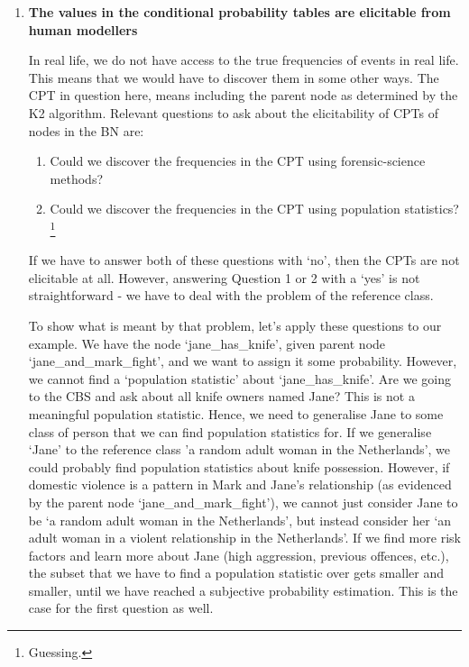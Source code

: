 \begin{enumerate}
\item \textbf{The values in the conditional probability tables are elicitable from human modellers}

In real life, we do not have access to the true frequencies of events in real life. This means that we would have to discover them in some other ways. The CPT in question here, means including the parent node as determined by the K2 algorithm. Relevant questions to ask about the elicitability of CPTs of nodes in the BN are:
\begin{enumerate}
\item Could we discover the frequencies in the CPT using forensic-science methods?
\item Could we discover the frequencies in the CPT using population statistics?
\footnote{Guessing.}
\end{enumerate}

If we have to answer both of these questions with `no', then the CPTs are not elicitable at all. However, answering Question 1 or 2 with a `yes' is not straightforward  - we have to deal with the problem of the reference class.

To show what is meant by that problem, let's apply these questions to our example. We have the node `jane\_has\_knife', given parent node `jane\_and\_mark\_fight', and we want to assign it some probability. However, we cannot find a `population statistic' about `jane\_has\_knife'. Are we going to the CBS and ask about all knife owners named Jane? This is not a meaningful population statistic. Hence, we need to generalise Jane to some class of person that we can find population statistics for. If we generalise `Jane' to the reference class 'a random adult woman in the Netherlands', we could probably find population statistics about knife possession. However, if domestic violence is a pattern in Mark and Jane's relationship (as evidenced by the parent node `jane\_and\_mark\_fight'), we cannot just consider Jane to be `a random adult woman in the Netherlands', but instead consider her `an adult woman in a violent relationship in the Netherlands'. If we find more risk factors and learn more about Jane (high aggression, previous offences, etc.), the subset that we have to find a population statistic over gets smaller and smaller, until we have reached a subjective probability estimation. This is the case for the first question as well.


\end{enumerate}
